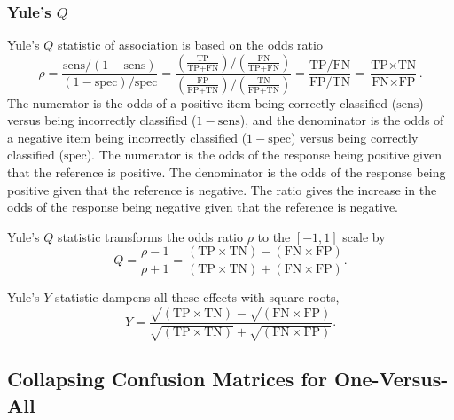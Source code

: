 \subsubsection{Yule's $Q$}

Yule's $Q$ statistic of association is based on the odds ratio
%
\begin{equation}
\rho 
= \frac{\mbox{sens}/(1 - \mbox{sens})}
       {(1 - \mbox{spec})/\mbox{spec}}
= \frac{\left( \frac{\mbox{TP}}{\mbox{TP}+\mbox{FN}} \right) \Big/ \left( \frac{\mbox{FN}}{\mbox{TP}+\mbox{FN}} \right) }
       {\left( \frac{\mbox{FP}}{\mbox{FP}+\mbox{TN}} \right) \Big/ \left( \frac{\mbox{TN}}{\mbox{FP}+\mbox{TN}} \right) }
= \frac{\mbox{TP}/\mbox{FN}}{\mbox{FP}/\mbox{TN}}
= \frac{\mbox{TP} \times \mbox{TN}}{\mbox{FN} \times \mbox{FP}}.
\end{equation}
%
The numerator is the odds of a positive item being correctly
classified ($\mbox{sens}$) versus being incorrectly classified ($1 -
\mbox{sens}$), and the denominator is the odds of a negative item
being incorrectly classified ($1 - \mbox{spec}$) versus being
correctly classified ($\mbox{spec}$).  The numerator is the odds of
the response being positive given that the reference is positive.  The
denominator is the odds of the response being positive given that the
reference is negative.  The ratio gives the increase in the odds
of the response being negative given that the reference is negative.

Yule's $Q$ statistic transforms the odds ratio $\rho$ to the $[-1,1]$
scale by
%
\begin{equation}
Q 
= \frac{\rho - 1}{\rho + 1}
= \frac{\left( \mbox{TP} \times \mbox{TN} \right) 
        - \left( \mbox{FN} \times \mbox{FP} \right)}
       {\left( \mbox{TP} \times \mbox{TN} \right) 
        + \left( \mbox{FN} \times \mbox{FP} \right)}.
\end{equation}

Yule's $Y$ statistic dampens all these effects with square roots,
%
\begin{equation}
Y
= \frac{\sqrt{\left( \mbox{TP} \times \mbox{TN} \right)}
        - \sqrt{\left( \mbox{FN} \times \mbox{FP} \right)}}
       {\sqrt{\left( \mbox{TP} \times \mbox{TN} \right)}
         + \sqrt{\left( \mbox{FN} \times \mbox{FP} \right)}}.
\end{equation}


\subsection{Collapsing Confusion Matrices for One-Versus-All}


